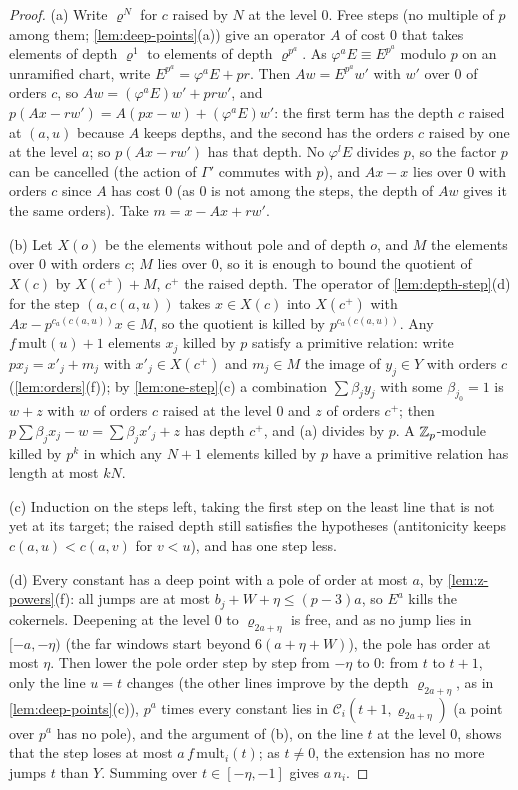\begin{proof}
(a) Write $\varrho^N$ for $c$ raised by $N$ at the level $0$. Free steps (no multiple of $p$ among them; \cref{lem:deep-points}(a)) give an operator $A$ of cost $0$ that takes elements of depth $\varrho^1$ to elements of depth $\varrho^{p^a}$. As $\varphi^aE\equiv E^{p^a}$ modulo $p$ on an unramified chart, write
$E^{p^a}=\varphi^aE+pr$. Then $Aw=E^{p^a}w'$ with $w'$ over $0$ of orders $c$, so $Aw=(\varphi^aE)w'+prw'$, and $p(Ax-rw')=A(px-w)+(\varphi^aE)w'$: the first term has the depth $c$ raised at $(a,u)$ because $A$ keeps depths, and the second has the orders $c$ raised by one at the level $a$; so $p(Ax-rw')$ has
that depth. No $\varphi^lE$ divides $p$, so the factor $p$ can be cancelled (the action of $\Gamma'$ commutes with $p$), and $Ax-x$ lies over $0$ with orders $c$ since $A$ has cost $0$ (as $0$ is not among the steps, the depth of $Aw$ gives it the same orders). Take $m=x-Ax+rw'$.

(b) Let $X(o)$ be the elements without pole and of depth $o$, and $M$ the elements over $0$ with orders $c$; $M$ lies over $0$, so it is enough to bound the quotient of $X(c)$ by $X(c^+)+M$, $c^+$ the raised depth. The operator of \cref{lem:depth-step}(d) for the step $(a,c(a,u))$ takes $x\in X(c)$ into $X(c^+)$ with
$Ax-p^{c_a(c(a,u))}x\in M$, so the quotient is killed by $p^{c_a(c(a,u))}$. Any $f\,\mathrm{mult}(u)+1$ elements $x_j$ killed by $p$ satisfy a primitive relation: write $px_j=x'_j+m_j$ with $x'_j\in X(c^+)$ and $m_j\in M$ the image of $y_j\in Y$ with orders $c$ (\cref{lem:orders}(f)); by \cref{lem:one-step}(c) a combination
$\sum\beta_jy_j$ with some $\beta_{j_0}=1$ is $w+z$ with $w$ of orders $c$ raised at the level $0$ and $z$ of orders $c^+$; then $p\sum\beta_jx_j-w=\sum\beta_jx'_j+z$ has depth $c^+$, and (a) divides by $p$. A $\mathbb{Z}_p$-module killed by $p^k$ in which any $N+1$ elements killed by $p$ have a primitive relation has length
at most $kN$.

(c) Induction on the steps left, taking the first step on the least line that is not yet at its target; the raised depth still satisfies the hypotheses (antitonicity keeps $c(a,u)<c(a,v)$ for $v<u$), and has one step less.

(d) Every constant has a deep point with a pole of order at most $a$, by \cref{lem:z-powers}(f): all jumps are at most $b_j+W+\eta\le(p-3)a$, so $E^a$ kills the cokernels. Deepening at the level $0$ to $\varrho_{2a+\eta}$ is free, and as no jump lies in $[-a,-\eta)$ (the far windows start beyond $6(a+\eta+W)$), the pole has order at
most $\eta$. Then lower the pole order step by step from $-\eta$ to $0$: from $t$ to $t+1$, only the line $u=t$ changes (the other lines improve by the depth $\varrho_{2a+\eta}$, as in \cref{lem:deep-points}(c)), $p^a$ times every constant lies in $\mathcal C_i(t+1,\varrho_{2a+\eta})$ (a point over $p^a$ has no pole), and the
argument of (b), on the line $t$ at the level $0$, shows that the step loses at most $a\,f\,\mathrm{mult}_i(t)$; as $t\ne0$, the extension has no more jumps $t$ than $Y$. Summing over $t\in[-\eta,-1]$ gives $a\,n_i$.


\end{proof}
